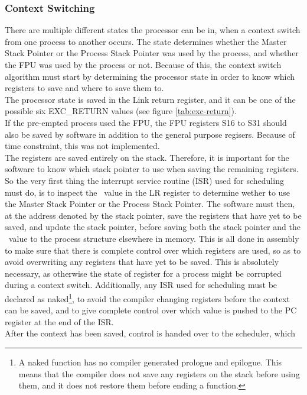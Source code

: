 \subsubsection{Context Switching}
There are multiple different states the processor can be in, when a context 
switch from one process to another occurs. The state determines whether the
Master Stack Pointer or the Process Stack Pointer was used by the process,
and whether the FPU was used by the process or not. Because of this, the context
switch algorithm must start by determining the processor state in order to know
which registers
to save and where to save them to.\\
The processor state is saved in the Link return register, and it can be one of
the possible six EXC\_RETURN values (see figure \ref{tab:exc-return}).\\
If the pre-empted process used the FPU, the FPU registers S16 to S31
should also be saved by software in addition to the general purpose regisers.
Because of time constraint, this was not implemented.\\
The registers are saved entirely on the stack. Therefore, it is important for
the software to know which
stack pointer to use when saving the remaining registers. So the very first
thing the interrupt service routine (ISR) used for scheduling must do, is to inspect
the \excreturn\ value in the LR register to determine wether to use the 
Master Stack Pointer or the Process Stack Pointer. The software must then, at 
the address denoted by the stack pointer, save the registers that have yet to be
saved, and update the stack pointer, before saving both the stack pointer and
the \excreturn\ value to the process structure elsewhere in memory. This is all
done in assembly to make sure that there is complete control over which
registers are used, so as to avoid overwriting any registers that have yet to be
saved. This is absolutely necessary, as otherwise the state of register for a
process might be corrupted during a context switch. Additionally, any ISR used
for scheduling must be declared as naked\footnote{A naked function has no
compiler generated prologue and epilogue. This means that the compiler does not
save any registers on the stack before using them, and it does not restore them
before ending a function.}, to avoid the compiler changing registers before the
context can be saved, and to give complete control over which value is pushed to
the PC register at the end of the ISR.\\
After the context has been saved, control is handed over to the scheduler, which
